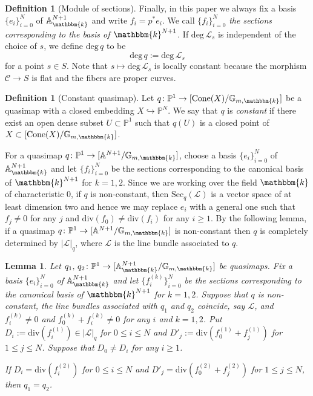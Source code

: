\documentclass[12pt,twoside]{amsart}
\newtheorem{lem}[thm]{Lemma}
\theoremstyle{definition}
\newtheorem{defn}[thm]{Definition}
\begin{document}
\begin{defn}[Module of sections]
Finally, in this paper we always fix a basis $\{e_i\}_{i=0}^N$ of $\mathbb{A}^{N+1}_{\mathbbm{k}}$ and write $f_i=p^*e_i$. 
We call $\{f_i\}_{i=0}^N$ {\it the sections corresponding to the basis of $\mathbbm{k}^{N+1}$}. 
If $\mathrm{deg}\,\mathscr{L}_{s}$ is independent of the choice of $s$, we define $\mathrm{deg}\,q$ to be
$$\mathrm{deg}\,q :=\mathrm{deg}\,\mathscr{L}_{s}$$
 for a point $s\in S$. 
Note that $s\mapsto \mathrm{deg}\,\mathscr{L}_{s}$ is locally constant because the morphism $\mathcal{C} \to S$ is flat and the fibers are proper curves. 

\end{defn}

\begin{defn}[Constant quasimap]\label{defn--quasi--map--const}
   Let $q\colon \mathbb{P}^1\to [\mathrm{Cone}(X)/\mathbb{G}_{m,\mathbbm{k}}]$ be a  quasimap with a closed embedding $X\hookrightarrow \mathbb{P}^N$.
    We say that $q$ is {\it constant} if there exist an open dense subset $U\subset \mathbb{P}^1$ such that $q(U)$ is a closed point of $X\subset [\mathrm{Cone}(X)/\mathbb{G}_{m,\mathbbm{k}}]$.
\end{defn}

For a quasimap $q\colon \mathbb{P}^1\to [\mathbb{A}^{N+1}/\mathbb{G}_{m,\mathbbm{k}}]$, choose a basis $\{e_i\}_{i=0}^N$ of $\mathbb{A}^{N+1}_{\mathbbm{k}}$ and let $\{f_i\}_{i=0}^N$ be the sections corresponding to the canonical basis of $\mathbbm{k}^{N+1}$ for $k=1,2$.
Since we are working over the field $\mathbbm{k}$ of characteristic $0$, if $q$ is non-constant, then $\mathrm{Sec}_q(\mathscr{L})$ is a vector space of at least dimension two and hence we may replace $e_i$ with a general one such that $f_j\ne0$ for any $j$ and $\mathrm{div}(f_0)\ne\mathrm{div}(f_i)$ for any $i\ge1$.
By the following lemma, if a quasimap $q\colon \mathbb{P}^1\to [\mathbb{A}^{N+1}/\mathbb{G}_{m,\mathbbm{k}}]$ is non-constant then $q$ is completely determined by  $|\mathscr{L}|_q$, where $\mathscr{L}$ is the line bundle associated to $q$.
\begin{lem}\label{lem}
    Let $q_1,\,q_2\colon \mathbb{P}^1\to [\mathbb{A}_{\mathbbm{k}}^{N+1}/\mathbb{G}_{m,\mathbbm{k}}]$ be quasimaps.
    Fix a basis $\{e_i\}_{i=0}^N$ of $\mathbb{A}^{N+1}_{\mathbbm{k}}$ and let $\{f^{(k)}_i\}_{i=0}^N$ be the sections corresponding to the canonical basis of $\mathbbm{k}^{N+1}$ for $k=1,2$.
    Suppose that $q$ is non-constant, the line bundles associated with $q_1$ and $q_2$ coincide, say $\mathscr{L}$, and $f^{(k)}_i\ne0$ and $f^{(k)}_0+f^{(k)}_i\ne0$ for any $i$ and $k=1,2$.
    Put $D_i:=\mathrm{div}(f^{(1)}_i)\in |\mathscr{L}|_q$ for $0\le i\le N$ and $D'_{j}:=\mathrm{div}(f^{(1)}_0+ f^{(1)}_j)$ for $1\le j\le N$.
    Suppose that $D_0\ne D_i$ for any $i\ge1$.
    
    If $D_i=\mathrm{div}(f^{(2)}_i)$ for $0\le i\le N$ and $D'_{j}=\mathrm{div}(f^{(2)}_0+ f^{(2)}_j)$ for $1\le j\le N$, then $q_1=q_2$.
\end{lem}
\end{document}
